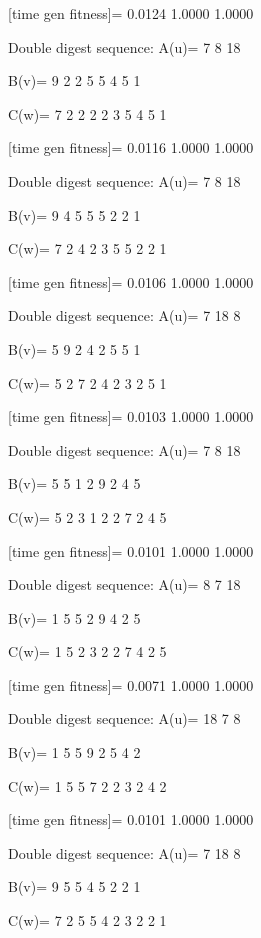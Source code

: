[time gen fitness]=
    0.0124    1.0000    1.0000

Double digest sequence:
A(u)=
     7     8    18

B(v)=
     9     2     2     5     5     4     5     1

C(w)=
     7     2     2     2     2     3     5     4     5     1

[time gen fitness]=
    0.0116    1.0000    1.0000

Double digest sequence:
A(u)=
     7     8    18

B(v)=
     9     4     5     5     5     2     2     1

C(w)=
     7     2     4     2     3     5     5     2     2     1

[time gen fitness]=
    0.0106    1.0000    1.0000

Double digest sequence:
A(u)=
     7    18     8

B(v)=
     5     9     2     4     2     5     5     1

C(w)=
     5     2     7     2     4     2     3     2     5     1

[time gen fitness]=
    0.0103    1.0000    1.0000

Double digest sequence:
A(u)=
     7     8    18

B(v)=
     5     5     1     2     9     2     4     5

C(w)=
     5     2     3     1     2     2     7     2     4     5

[time gen fitness]=
    0.0101    1.0000    1.0000

Double digest sequence:
A(u)=
     8     7    18

B(v)=
     1     5     5     2     9     4     2     5

C(w)=
     1     5     2     3     2     2     7     4     2     5

[time gen fitness]=
    0.0071    1.0000    1.0000

Double digest sequence:
A(u)=
    18     7     8

B(v)=
     1     5     5     9     2     5     4     2

C(w)=
     1     5     5     7     2     2     3     2     4     2

[time gen fitness]=
    0.0101    1.0000    1.0000

Double digest sequence:
A(u)=
     7    18     8

B(v)=
     9     5     5     4     5     2     2     1

C(w)=
     7     2     5     5     4     2     3     2     2     1

